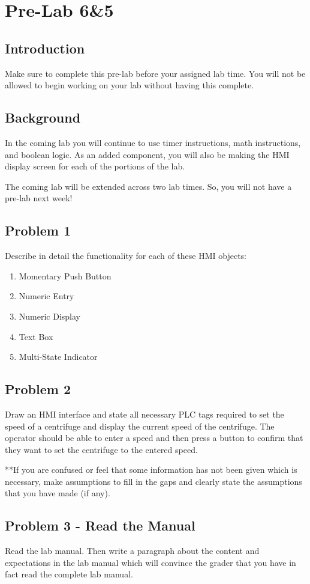 \chapter{Pre-Lab 6\&5}
\setcounter{TASignatures}{0}
\setcounter{AsideCounter}{0}

\section{Introduction}

Make sure to complete this pre-lab before your assigned lab time. You will not be allowed to begin working on your lab without having this complete.

\section{Background}


In the coming lab you will continue to use timer instructions, math instructions, and boolean logic. As an added component, you will also be making the HMI display screen for each of the portions of the lab. 

The coming lab will be extended across two lab times. So, you will not have a pre-lab next week!

\section{Problem 1}
Describe in detail the functionality for each of these HMI objects:
\begin{enumerate}
    \item Momentary Push Button
    \item Numeric Entry
    \item Numeric Display
    \item Text Box
    \item Multi-State Indicator
\end{enumerate}


\section{Problem 2}

Draw an HMI interface and state all necessary PLC tags required to set the speed of a centrifuge and display the current speed of the centrifuge. The operator should be able to enter a speed and then press a button to confirm that they want to set the centrifuge to the entered speed.

**If you are confused or feel that some information has not been given which is necessary, make assumptions to fill in the gaps and clearly state the assumptions that you have made (if any).

\section{Problem 3 - Read the Manual}

Read the lab manual. Then write a paragraph about the content and expectations in the lab manual which will convince the grader that you have in fact read the complete lab manual.